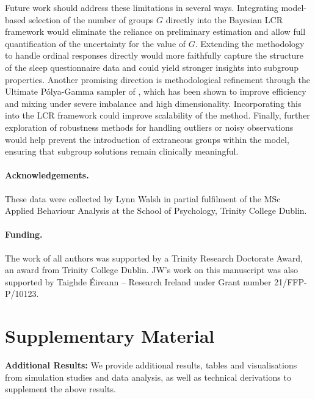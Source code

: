 \documentclass[11pt]{article}
\theoremstyle{plain}
\theoremstyle{definition}
\begin{document}
Future work should address these limitations in several ways. Integrating model-based selection of the number of groups $G$ directly into the Bayesian LCR framework would eliminate the reliance on preliminary estimation and allow full quantification of the uncertainty for the value of $G$. Extending the methodology to handle ordinal responses directly would more faithfully capture the structure of the sleep questionnaire data and could yield stronger insights into subgroup properties. Another promising direction is methodological refinement through the Ultimate Pólya-Gamma sampler of \citet{zens_ultimate_2024}, which has been shown to improve efficiency and mixing under severe imbalance and high dimensionality. Incorporating this into the LCR framework could improve scalability of the method. Finally, further exploration of robustness methods for handling outliers or noisy observations would help prevent the introduction of extraneous groups within the model, ensuring that subgroup solutions remain clinically meaningful. 
\paragraph{Acknowledgements.}
These data were collected by Lynn Walsh in partial fulfilment of the MSc Applied Behaviour Analysis at the School of Psychology, Trinity College Dublin.

\paragraph{Funding.}
The work of all authors was supported by a Trinity Research Doctorate Award, an award from Trinity College Dublin. JW's work on this manuscript was also supported by Taighde Éireann – Research Ireland under Grant number 21/FFP-P/10123.  

\section*{Supplementary Material}

\noindent\textbf{Additional Results:} We provide additional results, tables and visualisations from simulation studies and data analysis, as well as technical derivations to supplement the above results.

 
      
\end{document}
